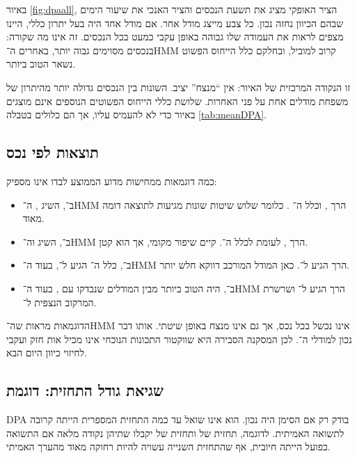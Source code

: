 באיור \ref{fig:dpaall}, הציר האופקי מציג את תשעת הנכסים והציר האנכי את שיעור הימים שבהם הכיוון נחזה נכון. כל צבע מייצג מודל אחר. אם מודל אחד היה בעל יתרון כללי, היינו מצפים לראות את העמודה שלו גבוהה באופן עקבי כמעט בכל הנכסים. זה אינו מה שקורה: בנכסים מסוימים  גבוה יותר, באחרים ה־HMM קרוב למוביל, ובחלקם כלל הייחוס הפשוט נשאר הטוב ביותר.

זו הנקודה המרכזית של האיור: אין ``מנצח'' יציב. השונות בין הנכסים גדולה יותר מהיתרון של משפחת מודלים אחת על פני האחרות. שלושת כללי הייחוס הפשוטים הנוספים אינם מוצגים באיור כדי לא להעמיס עליו, אך הם כלולים בטבלה \ref{tab:meanDPA}.

\subsection{תוצאות לפי נכס}

כמה דוגמאות ממחישות מדוע הממוצע לבדו אינו מספיק:

\begin{itemize}
    \item ב־,  השיג , ה־HMM הרך , וכלל ה־ . כלומר שלוש שיטות שונות מגיעות לתוצאה דומה מאוד.
    \item ב־,  השיג  וה־HMM הרך , לעומת  לכלל ה־. קיים שיפור מקומי, אך הוא קטן.
    \item ב־, כלל ה־ הגיע ל־, בעוד ה־HMM הרך הגיע ל־. כאן המודל המורכב דווקא חלש יותר.
    \item ב־,  היה הטוב ביותר מבין המודלים שנבדקו עם , בעוד ה־HMM הרך הגיע ל־ ושרשרת המרקוב הנצפית ל־.
\end{itemize}

הדוגמאות מראות שה־HMM אינו נכשל בכל נכס, אך גם אינו מנצח באופן שיטתי. אותו דבר נכון למודלי ה־. לכן המסקנה הסבירה היא שווקטור התכונות הנוכחי אינו מכיל אות חזק ועקבי לחיזוי כיוון היום הבא.

\subsection{שגיאת גודל התחזית: דוגמת }

DPA בודק רק אם הסימן היה נכון. הוא אינו שואל עד כמה התחזית המספרית הייתה קרובה לתשואה האמיתית. לדוגמה, תחזית של  ותחזית של  יקבלו שתיהן נקודה מלאה אם התשואה בפועל הייתה חיובית, אף שהתחזית השנייה עשויה להיות רחוקה מאוד מהערך האמיתי.

